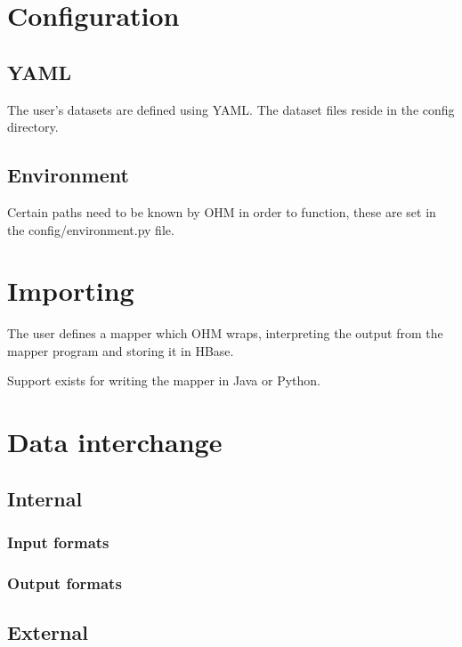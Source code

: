 \documentclass[a4paper,10pt]{book}
\begin{document}
\section{Configuration}

\subsection{YAML}

The user's datasets are defined using YAML. The dataset files reside in the
config directory.


\subsection{Environment}

Certain paths need to be known by OHM in order to function, these are set
in the config/environment.py file.



\section{Importing}

The user defines a mapper which OHM wraps, interpreting the output from the
mapper program and storing it in HBase.

Support exists for writing the mapper in Java or Python.



\section{Data interchange}

\subsection{Internal}

\subsubsection{Input formats}

\subsubsection{Output formats}

\subsection{External}
\end{document}
